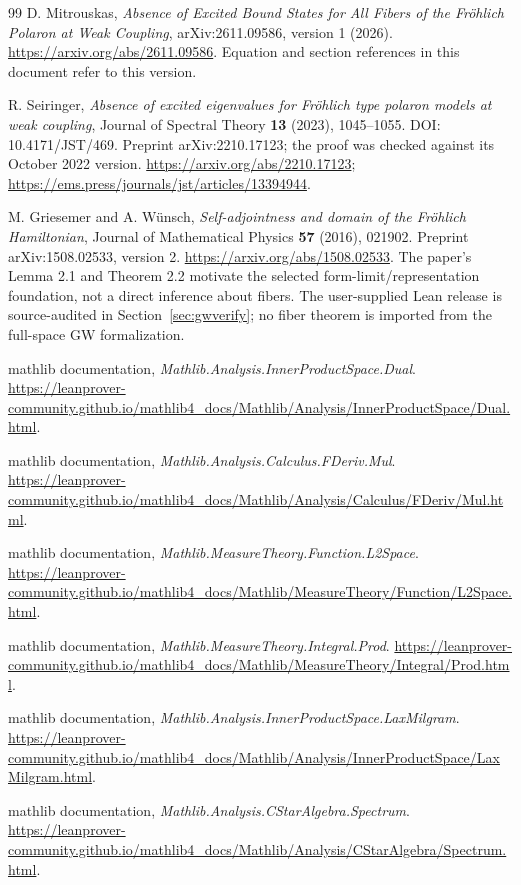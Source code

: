 \documentclass[11pt,a4paper]{article}
\theoremstyle{remark}\newtheorem{remark}[theorem]{Remark}
\begin{document}
\begin{thebibliography}{99}
D. Mitrouskas,
\emph{Absence of Excited Bound States for All Fibers of the Fr\"ohlich Polaron at Weak Coupling},
arXiv:2611.09586, version 1 (2026).
\url{https://arxiv.org/abs/2611.09586}.
Equation and section references in this document refer to this version.

R. Seiringer,
\emph{Absence of excited eigenvalues for Fr\"ohlich type polaron models at weak coupling},
Journal of Spectral Theory \textbf{13} (2023), 1045--1055.
DOI: 10.4171/JST/469.
Preprint arXiv:2210.17123; the proof was checked against its October 2022 version.
\url{https://arxiv.org/abs/2210.17123};
\url{https://ems.press/journals/jst/articles/13394944}.

M. Griesemer and A. W\"unsch,
\emph{Self-adjointness and domain of the Fr\"ohlich Hamiltonian},
Journal of Mathematical Physics \textbf{57} (2016), 021902.
Preprint arXiv:1508.02533, version 2. \url{https://arxiv.org/abs/1508.02533}. The paper's Lemma 2.1 and Theorem 2.2 motivate the selected form-limit/representation foundation, not a direct inference about fibers. The user-supplied Lean release is source-audited in Section~\ref{sec:gwverify}; no fiber theorem is imported from the full-space GW formalization.

mathlib documentation,
\emph{Mathlib.Analysis.InnerProductSpace.Dual}.
\url{https://leanprover-community.github.io/mathlib4_docs/Mathlib/Analysis/InnerProductSpace/Dual.html}.

mathlib documentation,
\emph{Mathlib.Analysis.Calculus.FDeriv.Mul}.
\url{https://leanprover-community.github.io/mathlib4_docs/Mathlib/Analysis/Calculus/FDeriv/Mul.html}.

mathlib documentation,
\emph{Mathlib.MeasureTheory.Function.L2Space}.
\url{https://leanprover-community.github.io/mathlib4_docs/Mathlib/MeasureTheory/Function/L2Space.html}.

mathlib documentation,
\emph{Mathlib.MeasureTheory.Integral.Prod}.
\url{https://leanprover-community.github.io/mathlib4_docs/Mathlib/MeasureTheory/Integral/Prod.html}.

mathlib documentation,
\emph{Mathlib.Analysis.InnerProductSpace.LaxMilgram}.
\url{https://leanprover-community.github.io/mathlib4_docs/Mathlib/Analysis/InnerProductSpace/LaxMilgram.html}.

mathlib documentation,
\emph{Mathlib.Analysis.CStarAlgebra.Spectrum}.
\url{https://leanprover-community.github.io/mathlib4_docs/Mathlib/Analysis/CStarAlgebra/Spectrum.html}.
\end{thebibliography}
\end{document}
